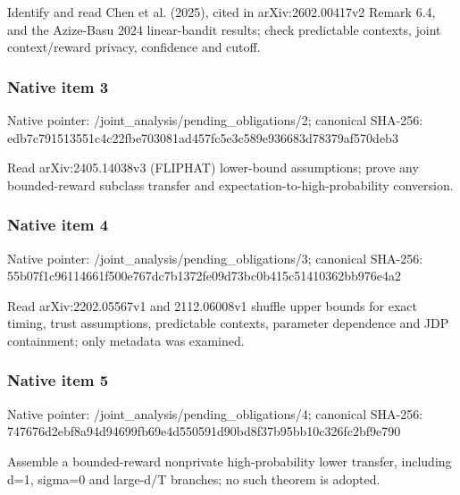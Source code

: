 \documentclass[10pt,a4paper]{article}
\begin{document}
\begingroup\raggedright\sloppy Identify and read Chen et al. (2025),\allowbreak{} cited in arXiv:\allowbreak{}2602.00417v2 Remark 6.4,\allowbreak{} and the Azize-Basu 2024 linear-bandit results;\allowbreak{} check predictable contexts,\allowbreak{} joint context/\allowbreak{}reward privacy,\allowbreak{} confidence and cutoff.\par\endgroup

\subsubsection{Native item 3}
Native pointer: /joint\_\allowbreak{}analysis/pending\_\allowbreak{}obligations/2; canonical SHA-256: edb7c791513551c4c22fbe703081ad457fc5e3c589e936683d78379af570deb3

\begingroup\raggedright\sloppy Read arXiv:\allowbreak{}2405.14038v3 (FLIPHAT) lower-bound assumptions;\allowbreak{} prove any bounded-reward subclass transfer and expectation-to-high-probability conversion.\par\endgroup

\subsubsection{Native item 4}
Native pointer: /joint\_\allowbreak{}analysis/pending\_\allowbreak{}obligations/3; canonical SHA-256: 55b07f1c96114661f500e767dc7b1372fe09d73bc0b415c51410362bb976e4a2

\begingroup\raggedright\sloppy Read arXiv:\allowbreak{}2202.05567v1 and 2112.06008v1 shuffle upper bounds for exact timing,\allowbreak{} trust assumptions,\allowbreak{} predictable contexts,\allowbreak{} parameter dependence and JDP containment;\allowbreak{} only metadata was examined.\par\endgroup

\subsubsection{Native item 5}
Native pointer: /joint\_\allowbreak{}analysis/pending\_\allowbreak{}obligations/4; canonical SHA-256: 747676d2ebf8a94d94699fb69e4d550591d90bd8f37b95bb10c326fc2bf9e790

\begingroup\raggedright\sloppy Assemble a bounded-reward nonprivate high-probability lower transfer,\allowbreak{} including d=\allowbreak{}1,\allowbreak{} sigma=\allowbreak{}0 and large-d/\allowbreak{}T branches;\allowbreak{} no such theorem is adopted.\par\endgroup
\end{document}
